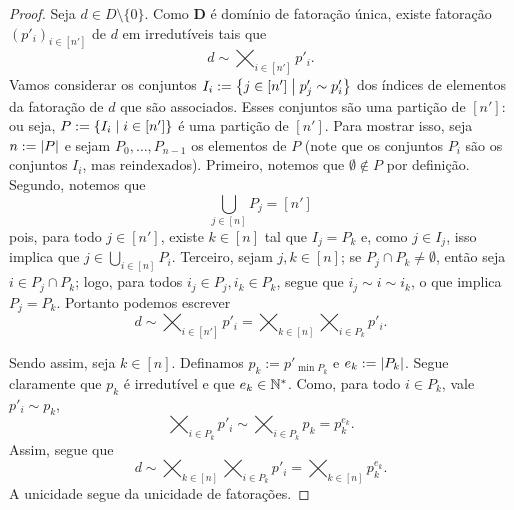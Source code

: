 \begin{proof}
Seja $d \in D \setminus \{0\}$. Como $\bm D$ é domínio de fatoração única, existe fatoração $(p'_i)_{i \in [n']}$ de $d$ em irredutíveis tais que
	\begin{equation*}
	d \sim \bigtimes_{i \in [n']} p'_i.
	\end{equation*}
Vamos considerar os conjuntos $I_i := \left\{{j \in [n']}\;\middle\vert\;{p'_j \sim p'_i}\right\}$ dos índices de elementos da fatoração de $d$ que são associados. Esses conjuntos são uma partição de $[n']$: ou seja, $P := \left\{{I_i}\;\middle\vert\;{i \in [n']}\right\}$ é uma partição de $[n']$. Para mostrar isso, seja $n := \left\lvert{P}\right\rvert$ e sejam $P_0,\ldots,P_{n-1}$ os elementos de $P$  (note que os conjuntos $P_i$ são os conjuntos $I_i$, mas reindexados). Primeiro, notemos que $\emptyset \notin P$ por definição. Segundo, notemos que
	\begin{equation*}
	\bigcup_{j \in [n]} P_j = [n']
	\end{equation*}
pois, para todo $j \in [n']$, existe $k \in [n]$ tal que $I_j = P_k$ e, como $j \in I_j$, isso implica que $j \in \bigcup_{i \in [n]} P_i$. Terceiro, sejam $j,k \in [n]$; se $P_j \cap P_k \neq \emptyset$, então seja $i \in P_j \cap P_k$; logo, para todos $i_j \in P_j,i_k \in P_k$, segue que $i_j \sim i \sim i_k$, o que implica $P_j=P_k$. Portanto podemos escrever
	\begin{equation*}
	d \sim \bigtimes_{i \in [n']} p'_i = \bigtimes_{k \in [n]} \bigtimes_{i \in P_k} p'_i.
	\end{equation*}

Sendo assim, seja $k \in [n]$. Definamos $p_k := p'_{\min P_k}$ e $e_k := \left\lvert{P_k}\right\rvert$. Segue claramente que $p_k$ é irredutível e que $e_k \in \mathbb{N}^*$. Como, para todo $i \in P_k$, vale $p'_i \sim p_k$, 
	\begin{equation*}
	\bigtimes_{i \in P_k} p'_i \sim \bigtimes_{i \in P_k} p_k = p_k^{e_k}.
	\end{equation*}
Assim, segue que
	\begin{equation*}
	d \sim \bigtimes_{k \in [n]} \bigtimes_{i \in P_k} p'_i = \bigtimes_{k \in [n]} p_k^{e_k}.
	\end{equation*}
A unicidade segue da unicidade de fatorações.
\end{proof}

